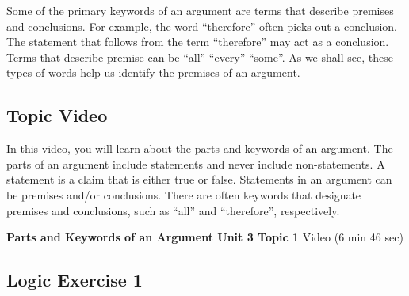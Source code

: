 \documentclass[
]{book}
\begin{document}
Some of the primary keywords of an argument are terms that describe premises and conclusions. For example, the word ``therefore'' often picks out a conclusion. The statement that follows from the term ``therefore'' may act as a conclusion. Terms that describe premise can be ``all'' ``every'' ``some''. As we shall see, these types of words help us identify the premises of an argument.

\hypertarget{topic-video-8}{%
\subsection*{Topic Video}\label{topic-video-8}}

In this video, you will learn about the parts and keywords of an argument. The parts of an argument include statements and never include non-statements. A statement is a claim that is either true or false. Statements in an argument can be premises and/or conclusions. There are often keywords that designate premises and conclusions, such as ``all'' and ``therefore'', respectively.

\textbf{Parts and Keywords of an Argument Unit 3 Topic 1} Video (6 min 46 sec)

\hypertarget{logic-exercise-1}{%
\subsection*{Logic Exercise 1}\label{logic-exercise-1}}
\end{document}
